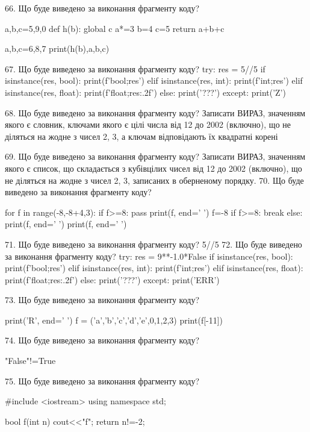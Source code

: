 \documentclass[11pt]{article}
\begin{document}
66. Що буде виведено за виконання фрагменту коду?

a,b,c=5,9,0
def h(b):
global c    a*=3
    b=4
    c=5
    return a+b+c

a,b,c=6,8,7
print(h(b),a,b,c)

67. Що буде виведено за виконання фрагменту коду?
try:
    res = 5//5%
    if isinstance(res, bool):
        print(f'bool;{res}')
    elif isinstance(res, int):
        print(f'int;{res}')
    elif isinstance(res, float):
        print(f'float;{res:.2f}')
    else:
        print('???')
except:
    print('Z')

68. Що буде виведено за виконання фрагменту коду?
Записати ВИРАЗ, значенням якого є словник, ключами якого є цілі числа від 12 до 2002 (включно), що не діляться на жодне з чисел 2, 3, а ключам відповідають їх квадратні корені 

69. Що буде виведено за виконання фрагменту коду?
Записати ВИРАЗ, значенням якого є список, що складається з кубівцілих чисел від 12 до 2002 (включно), що не діляться на жодне з чисел 2, 3, записаних в оберненому порядку.
70. Що буде виведено за виконання фрагменту коду?

for f in range(-8,-8+4,3):
    if f>=8:
        pass
    print(f, end=' ')
    f=-8
    if f>=8:
        break
else:
    print(f, end=' ')
print(f, end=' ')

71. Що буде виведено за виконання фрагменту коду?
5//5%
72. Що буде виведено за виконання фрагменту коду?
try:
    res = 9**-1.0*False
    if isinstance(res, bool):
        print(f'bool;{res}')
    elif isinstance(res, int):
        print(f'int;{res}')
    elif isinstance(res, float):
        print(f'float;{res:.2f}')
    else:
        print('???')
except:
    print('ERR')

73. Що буде виведено за виконання фрагменту коду?

print('R', end=' ')
f = ('a','b','c','d','e',0,1,2,3)
print(f[-11])


74. Що буде виведено за виконання фрагменту коду?

"False"!=True

75. Що буде виведено за виконання фрагменту коду?

#include <iostream>
using namespace std;

bool f(int n){
    cout<<"f";
    return n!=-2;
}
\end{document}
